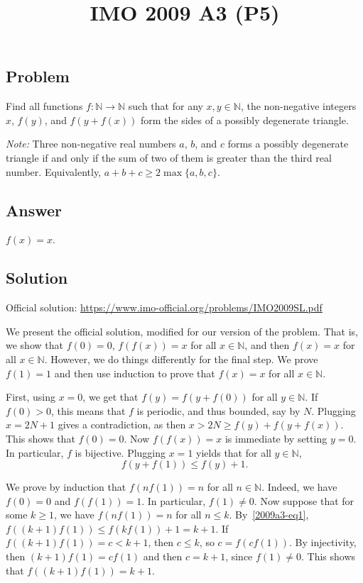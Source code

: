 \documentclass{article}
\title{IMO 2009 A3 (P5)}
\author{}
\date{}
\newcommand{\N}{\mathbb{N}}
\begin{document}
\maketitle



\subsection*{Problem}

Find all functions $f : \N \to \N$ such that for any $x, y \in \N$, the non-negative integers $x$, $f(y)$, and $f(y + f(x))$ form the sides of a possibly degenerate triangle.

\emph{Note:}
Three non-negative real numbers $a$, $b$, and $c$ forms a possibly degenerate triangle if and only if the sum of two of them is greater than the third real number.
Equivalently, $a + b + c \geq 2 \max\{a, b, c\}$.



\subsection*{Answer}

$f(x) = x$.



\subsection*{Solution}

Official solution: \url{https://www.imo-official.org/problems/IMO2009SL.pdf}

We present the official solution, modified for our version of the problem.
That is, we show that $f(0) = 0$, $f(f(x)) = x$ for all $x \in \N$, and then $f(x) = x$ for all $x \in \N$.
However, we do things differently for the final step.
We prove $f(1) = 1$ and then use induction to prove that $f(x) = x$ for all $x \in \N$.

First, using $x = 0$, we get that $f(y) = f(y + f(0))$ for all $y \in \N$.
If $f(0) > 0$, this means that $f$ is periodic, and thus bounded, say by $N$.
Plugging $x = 2N + 1$ gives a contradiction, as then $x > 2N \geq f(y) + f(y + f(x))$.
This shows that $f(0) = 0$.
Now $f(f(x)) = x$ is immediate by setting $y = 0$.
In particular, $f$ is bijective.
Plugging $x = 1$ yields that for all $y \in \N$,
\[ f(y + f(1)) \leq f(y) + 1. \tag{1}\label{2009a3-eq1} \]

We prove by induction that $f(n f(1)) = n$ for all $n \in \N$.
Indeed, we have $f(0) = 0$ and $f(f(1)) = 1$.
In particular, $f(1) \neq 0$.
Now suppose that for some $k \geq 1$, we have $f(n f(1)) = n$ for all $n \leq k$.
By~\eqref{2009a3-eq1}, $f((k + 1) f(1)) \leq f(k f(1)) + 1 = k + 1$.
If $f((k + 1) f(1)) = c < k + 1$, then $c \leq k$, so $c = f(c f(1))$.
By injectivity, then $(k + 1) f(1) = c f(1)$ and then $c = k + 1$, since $f(1) \neq 0$.
This shows that $f((k + 1) f(1)) = k + 1$.
\end{document}

